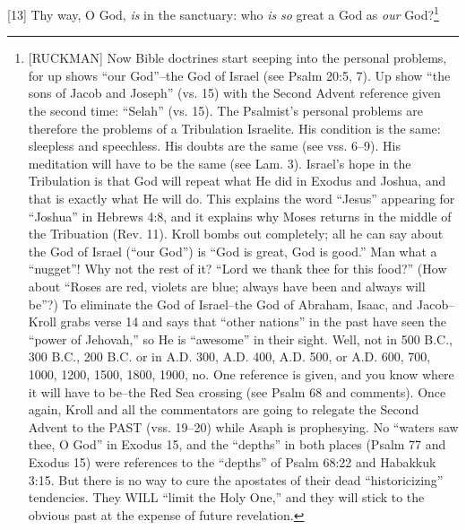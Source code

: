 [13] \textcolor[rgb]{0.00,0.00,1.00}{Thy way, O God, \emph{is} in the sanctuary: who \emph{is} \emph{so} great a God as \emph{our} God?}\footnote{[RUCKMAN] Now Bible doctrines start seeping into the personal problems, for up shows ``our God''--the God of Israel (see Psalm 20:5, 7). Up show “the sons of Jacob and Joseph” (vs. 15) with the Second Advent reference given the second time: “Selah” (vs. 15). The Psalmist’s personal problems are therefore the problems of a Tribulation Israelite. His condition is the same: sleepless and speechless. His doubts are the same (see vss. 6–9). His meditation will have to be the same (see Lam. 3). Israel’s hope in the Tribulation is that God will repeat what He did in Exodus and Joshua, and that is exactly what He will do. This explains the word “Jesus” appearing for “Joshua” in Hebrews 4:8, and it explains why Moses returns in the middle of the Tribuation (Rev. 11). Kroll bombs out completely; all he can say about the God of Israel (“our God”) is “God is great, God is good.” Man what a “nugget”! Why not the rest of it? “Lord we thank thee for this food?” (How about “Roses are red, violets are blue; always have been and always will be”?) To eliminate the God of Israel--the God of Abraham, Isaac, and Jacob--Kroll grabs verse 14 and says that “other nations” in the past have seen the “power of Jehovah,” so He is “awesome” in their sight. Well, not in 500 B.C., 300 B.C., 200 B.C. or in A.D. 300, A.D. 400, A.D. 500, or A.D. 600, 700, 1000, 1200, 1500, 1800, 1900, no. One reference is given, and you know where it will have to be--the Red Sea crossing (see Psalm 68 and comments). Once again, Kroll and all the commentators are going to relegate the Second Advent to the PAST (vss. 19--20) while Asaph is prophesying. No ``waters saw thee, O God'' in Exodus 15, and the “depths” in both places (Psalm 77 and Exodus 15) were references to the ``depths'' of Psalm 68:22 and Habakkuk 3:15. But there is no way to cure the apostates of their dead “historicizing” tendencies. They WILL “limit the Holy One,” and they will stick to the obvious past at the expense of future revelation.\cite{Ruckman1992Psalms}}
